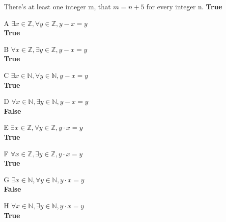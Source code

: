 \documentclass[12pt]{article}
\begin{document}
\begin{enumerate}
	There's at least one integer m, that $m=n+5$ for every integer n. \textbf{True}
    \item [A] $\exists x \in \mathbb{Z}, \forall y \in \mathbb{Z}, y -x=y$\\
	\textbf{True}
    \item [B] $\forall x \in \mathbb{Z}, \exists y \in \mathbb{Z}, y -x=y$\\
	\textbf{True}
    \item [C] $\exists x \in \mathbb{N}, \forall y \in \mathbb{N}, y-x=y$\\
	\textbf{True}
    \item [D] $\forall x \in \mathbb{N}, \exists y \in \mathbb{N}, y-x=y$\\
	\textbf{False}
    \item [E] $\exists x \in \mathbb{Z}, \forall y \in \mathbb{Z}, y\cdot x = y$\\
	\textbf{True}
    \item [F] $\forall x \in \mathbb{Z}, \exists y \in \mathbb{Z}, y \cdot x =y$\\
	\textbf{True}
    \item [G] $\exists x \in \mathbb{N}, \forall y \in \mathbb{N}, y\cdot x = y$\\
	\textbf{False}
    \item [H] $\forall x \in \mathbb{N}, \exists y \in \mathbb{N}, y\cdot x = y$\\
	\textbf{True}
\end{enumerate}
\end{document}
